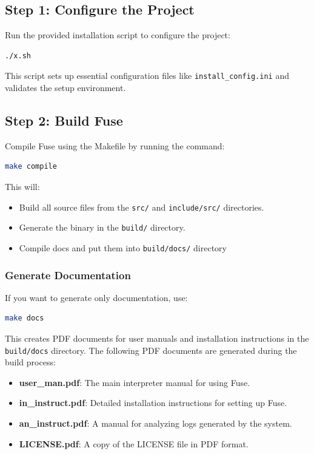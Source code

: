 \documentclass[a4paper,12pt]{article}
\begin{document}
\subsection*{Step 1: Configure the Project}
Run the provided installation script to configure the project:
\begin{lstlisting}[language=bash]
./x.sh
\end{lstlisting}
This script sets up essential configuration files like \texttt{install\_config.ini} and validates the setup environment.

\subsection*{Step 2: Build Fuse}
Compile Fuse using the Makefile by running the command:
\begin{lstlisting}[language=bash]
make compile
\end{lstlisting}
This will:
\begin{itemize}
	\item Build all source files from the \texttt{src/} and \texttt{include/src/} directories.
	\item Generate the binary in the \texttt{build/} directory.
	\item Compile docs and put them into \texttt{build/docs/} directory
\end{itemize}

\subsubsection*{Generate Documentation}
If you want to generate only documentation, use:
\begin{lstlisting}[language=bash]
make docs
\end{lstlisting}
This creates PDF documents for user manuals and installation instructions in the \texttt{build/docs} directory.
The following PDF documents are generated during the build process:
\begin{itemize}
	\item \textbf{user\_man.pdf}: The main interpreter manual for using Fuse.
	\item \textbf{in\_instruct.pdf}: Detailed installation instructions for setting up Fuse.
	\item \textbf{an\_instruct.pdf}: A manual for analyzing logs generated by the system.
	\item \textbf{LICENSE.pdf}: A copy of the LICENSE file in PDF format.
\end{itemize}
\end{document}
